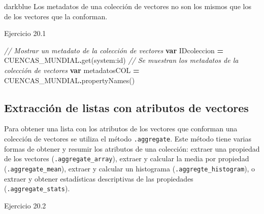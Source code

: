 \documentclass[
  12pt,
  letterpaper,
  twoside]{book}
\newenvironment{Shaded}{\begin{snugshade}}{\end{snugshade}}
\newcommand{\CommentTok}[1]{\textcolor[rgb]{0.56,0.35,0.01}{\textit{#1}}}
\newcommand{\FunctionTok}[1]{\textcolor[rgb]{0.00,0.00,0.00}{#1}}
\newcommand{\KeywordTok}[1]{\textcolor[rgb]{0.13,0.29,0.53}{\textbf{#1}}}
\newcommand{\NormalTok}[1]{#1}
\newcommand{\OperatorTok}[1]{\textcolor[rgb]{0.81,0.36,0.00}{\textbf{#1}}}
\newcommand{\StringTok}[1]{\textcolor[rgb]{0.31,0.60,0.02}{#1}}
\begin{document}
\begin{bluebox2}

\begin{awesomeblock}{5pt}{\faLightbulb}{darkblue}
Los metadatos de una colección de vectores no son los mismos que los de los vectores que la conforman.

\end{awesomeblock}

\end{bluebox2}

Ejercicio 20.1

\begin{Shaded}
\begin{Highlighting}[]
\CommentTok{// Mostrar un metadato de la colección de vectores}
\KeywordTok{var}\NormalTok{ IDcoleccion }\OperatorTok{=}\NormalTok{ CUENCAS\_MUNDIAL}\OperatorTok{.}\FunctionTok{get}\NormalTok{(}\StringTok{\textquotesingle{}system:id\textquotesingle{}}\NormalTok{) }
\CommentTok{// Se muestran los metadatos de la  colección de vectores}
\KeywordTok{var}\NormalTok{ metadatosCOL }\OperatorTok{=}\NormalTok{ CUENCAS\_MUNDIAL}\OperatorTok{.}\FunctionTok{propertyNames}\NormalTok{()}
\end{Highlighting}
\end{Shaded}

\hypertarget{extracciuxf3n-de-listas-con-atributos-de-vectores}{%
\subsection*{Extracción de listas con atributos de vectores}\label{extracciuxf3n-de-listas-con-atributos-de-vectores}}

Para obtener una lista con los atributos de los vectores que conforman una colección de vectores se utiliza el método \texttt{.aggregate}. Este método tiene varias formas de obtener y resumir los atributos de una colección: extraer una propiedad de los vectores (\texttt{.aggregate\_array}), extraer y calcular la media por propiedad (\texttt{.aggregate\_mean}), extraer y calcular un histograma (\texttt{.aggregte\_histogram}), o extraer y obtener estadísticas descriptivas de las propiedades (\texttt{.aggregate\_stats}).

Ejercicio 20.2
\end{document}
